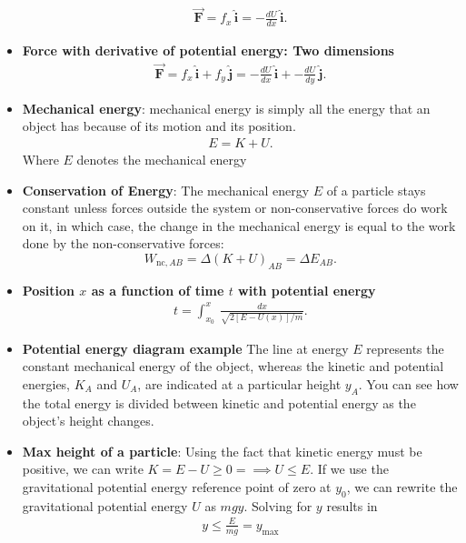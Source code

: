\documentclass{report}
\begin{document}
\begin{itemize}
\begin{align*}
            \vec{\mathbf{F}} = f_{x}\,\hat{\mathbf{i}} = -\frac{dU}{dx}\,\hat{\mathbf{i}}
        .\end{align*}
    \item \textbf{Force with derivative of potential energy: Two dimensions}
        \begin{align*}
            \vec{\mathbf{F}} = f_{x}\,\hat{\mathbf{i}} + f_{y}\,\hat{\mathbf{j}} = -\frac{dU}{dx}\,\hat{\mathbf{i}} + -\frac{dU}{dy}\,\hat{\mathbf{j}}
        .\end{align*}
    \item \textbf{Mechanical energy}:
        mechanical energy is simply all the energy that an object has because of its motion and its position.
        \begin{align*}
           E = K + U 
        .\end{align*}
        Where $E$ denotes the mechanical energy
    \item \textbf{Conservation of Energy}:
        The mechanical energy $E$ of a particle stays constant unless forces outside the system or non-conservative forces do work on it, in which case, the change in the mechanical energy is equal to the work done by the non-conservative forces:
        \[ W_{\text{nc},AB} = \Delta(K + U)_{AB} = \Delta E_{AB}. \]
    \item \textbf{Position $x$ as a function of time $t$ with potential energy}
        \begin{align*}
            t = \int_{x_{0}}^{x}\ \frac{dx}{\sqrt{2[E-U(x)]/m}}
        .\end{align*}
    \item \textbf{Potential energy diagram example}
        \bigbreak \noindent 
        \bigbreak \noindent 
        The line at energy \(E\) represents the constant mechanical energy of the object, whereas the kinetic and potential energies, \(K_A\) and \(U_A\), are indicated at a particular height \(y_A\). You can see how the total energy is divided between kinetic and potential energy as the object's height changes.
    \item \textbf{Max height of a particle}: Using the fact that kinetic energy must be positive, we can write $K = E-U \geq 0 =\implies U \leq E$. If we use the gravitational potential energy reference point of zero at $y_{0}$, we can rewrite the gravitational potential energy $U$ as $mgy$. Solving for $y$ results in
        \begin{align*}
            y \leq \frac{E}{mg} = y_{\text{max}}

\end{align*}
\end{itemize}
\end{document}
